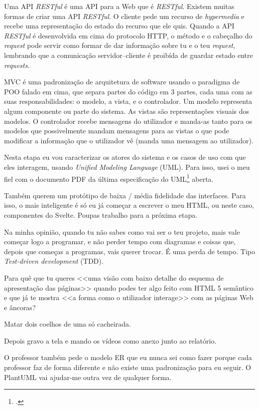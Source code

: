 \documentclass[12pt,a4paper,openright,oneside]{memoir}
\begin{document}
Uma API \textit{RESTful} é uma API para a Web que é \textit{RESTful}. Existem
muitas formas de criar uma API \textit{RESTful}. O cliente pede um recurso de
\textit{hypermedia} e recebe uma representação do estado do recurso que ele
quis. Quando a API \textit{RESTful} é desenvolvida em cima do protocolo HTTP, o
método e o cabeçalho do \textit{request} pode servir como formar de dar
informação sobre tu e o teu \textit{request}, lembrando que a comunicação
servidor--cliente é proibída de guardar estado entre \textit{requests}.

MVC é uma padronização de arquitetura de software usando o paradigma de POO
falado em cima, que separa partes do código em 3 partes, cada uma com as suas
responsabilidades: o modelo, a vista, e o controlador. Um modelo representa
algum componente ou parte do sistema. As vistas são representações visuais dos
modelos. O controlador recebe mensagens do utilizador e manda-as tanto para os
modelos que possivelmente mandam mensagens para as vistas o que pode modificar
a informação que o utilizador vê (manda uma mensagem ao utilizador).

Nesta etapa eu vou caracterizar os atores do sistema e os casos de uso com que
eles interagem, usando \textit{Unified Modeling Language} (UML). Para isso,
usei o meu fiel \autocite{plantuml} com o documento PDF da última especificação
do UML\footcite{uml251} aberta.

Também querem um protótipo de baixa / média fidelidade das interfaces. Para
isso, o mais inteligente é só eu já começar a escrever o meu HTML, ou neste
caso, componentes do Svelte. Poupas trabalho para a próxima etapa.

Na minha opinião, quando tu não sabes como vai ser o teu projeto, mais vale
começar logo a programar, e não perder tempo com diagramas e coisas que, depois
que começas a programas, vais querer trocar. É uma perda de tempo. Tipo
\textit{Test-driven development} (TDD).

Para quê que tu queres <<uma visão com baixo detalhe do esquema de apresentação
das páginas>> quando podes ter algo feito com HTML 5 semântico e que já te
mostra <<a forma como o utilizador interage>> com as páginas Web e âncoras?

Matar dois coelhos de uma só cacheirada.

Depois gravo a tela e mando os vídeos como anexo junto ao relatório.

O professor também pede o modelo ER que eu nunca sei como fazer porque cada
professor faz de forma diferente e não existe uma padronização para eu seguir.
O PlantUML vai ajudar-me outra vez de qualquer forma.
\end{document}
